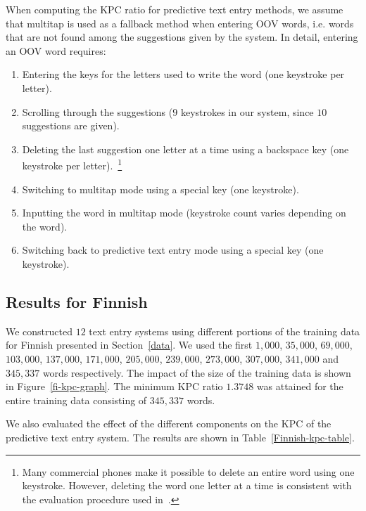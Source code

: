 \documentclass{llncs}
\begin{document}
When computing the KPC ratio for predictive text entry methods, we assume
that multitap is used as a fallback method when entering OOV words,
i.e. words that are not found among the suggestions given by the
system. In detail, entering an OOV word requires:
\begin{enumerate}
\item Entering the keys for the letters used to write the word (one
  keystroke per letter).
\item Scrolling through the suggestions ($9$ keystrokes in our system,
  since $10$ suggestions are given).
\item Deleting the last suggestion one letter at a time using a
  backspace key (one keystroke per letter).~\footnote{Many commercial
    phones make it possible to delete an entire word using one
    keystroke. However, deleting the word one letter at a time is
    consistent with the evaluation procedure used
    in~\cite{Tantug:2010}.}
\item Switching to multitap mode using a special key (one
  keystroke).
\item Inputting the word in multitap mode (keystroke count varies
  depending on the word).
\item Switching back to predictive text entry mode using a special key (one keystroke).
\end{enumerate}

\subsection{Results for Finnish}

We constructed $12$ text entry systems using different portions of the
training data for Finnish presented in Section~\ref{data}. We used the
first $1,000$, $35,000$, $69,000$, $103,000$, $137,000$, $171,000$,
$205,000$, $239,000$, $273,000$, $307,000$, $341,000$ and $345,337$ words
respectively. The impact of the size of the training data is shown in
Figure~\ref{fi-kpc-graph}. The minimum KPC ratio $1.3748$ was attained
for the entire training data consisting of $345,337$ words.

We also evaluated the effect of the different components on the KPC of
the predictive text entry system. The results are shown in
Table~\ref{Finnish-kpc-table}.
\end{document}
